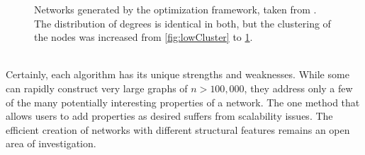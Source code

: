 \documentclass[11pt]{article}
\begin{document}
\begin{figure}[h!]
\begin{subfigure}{.35\textwidth}
    \caption{}
    \label{fig:highCluster}
  \end{subfigure}%
  \caption{Networks generated by the optimization framework, taken from \cite{Gounaris2013}. The distribution of degrees is identical in both, but the clustering of the nodes was increased from \ref{fig:lowCluster} to \ref{fig:highCluster}.}
  \label{fig:optCluster}
\end{figure}

\vspace{1mm}\\
\indent Certainly, each algorithm has its unique strengths and weaknesses. While some can rapidly construct very large graphs of $n>100,000$, they address only a few of the many potentially interesting properties of a network. The one method that allows users to add properties as desired suffers from scalability issues. The efficient creation of networks with different structural features remains an open area of investigation.
\end{document}
